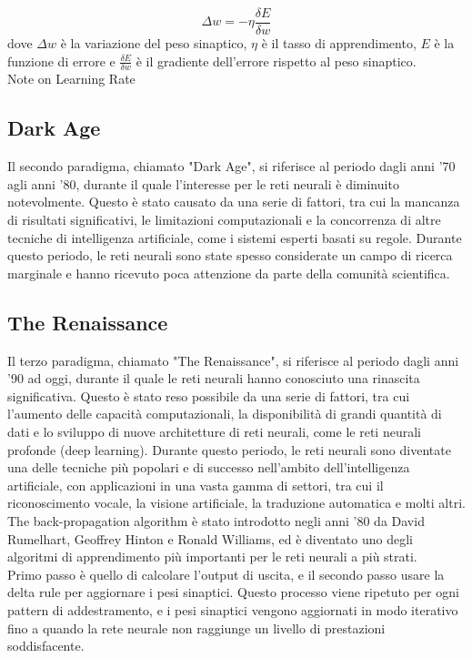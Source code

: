$$\Delta w=-\eta \frac {\delta E}{\delta w}$$
dove $\Delta w$ è la variazione del peso sinaptico, $\eta$ è il tasso di apprendimento, $E$ è la funzione di errore e $\frac{\delta E}{\delta w}$ è 
il gradiente dell'errore rispetto al peso sinaptico.\\

Note on Learning Rate
\subsection{Dark Age}
Il secondo paradigma, chiamato "Dark Age", si riferisce al periodo dagli anni '70 agli anni '80, durante il quale
l'interesse per le reti neurali è diminuito notevolmente. Questo è stato causato da una serie di fattori,
tra cui la mancanza di risultati significativi, le limitazioni computazionali e la concorrenza di altre 
tecniche di intelligenza artificiale, come i sistemi esperti basati su regole. Durante questo periodo, 
le reti neurali sono state spesso considerate un campo di ricerca marginale e hanno ricevuto poca
attenzione da parte della comunità scientifica.\\

\subsection{The Renaissance}
Il terzo paradigma, chiamato "The Renaissance", si riferisce al periodo dagli anni '90 ad oggi, durante il quale
le reti neurali hanno conosciuto una rinascita significativa. Questo è stato reso possibile da una serie di fattori,
tra cui l'aumento delle capacità computazionali, la disponibilità di grandi quantità di dati e lo sviluppo di nuove
architetture di reti neurali, come le reti neurali profonde (deep learning). Durante
questo periodo, le reti neurali sono diventate una delle tecniche più popolari e di successo nell'ambito
dell'intelligenza artificiale, con applicazioni in una vasta gamma di settori, tra cui il riconoscimento vocale, 
la visione artificiale, la traduzione automatica e molti altri.\\


The back-propagation algorithm è stato introdotto negli anni '80 da David Rumelhart, Geoffrey Hinton e Ronald Williams, 
ed è diventato uno degli algoritmi di apprendimento più importanti per le reti neurali a più strati.\\
Primo passo è quello di calcolare l'output di uscita, e il secondo passo usare la delta rule per aggiornare i pesi sinaptici.
Questo processo viene ripetuto per ogni pattern di addestramento, e i pesi sinaptici vengono aggiornati in modo iterativo fino 
a quando la rete neurale non raggiunge un livello di prestazioni soddisfacente.\\

